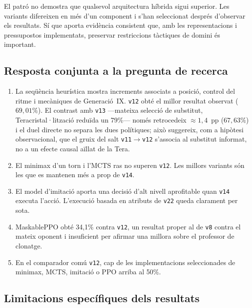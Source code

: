 El patró no demostra que qualsevol arquitectura híbrida sigui superior. Les variants difereixen en més d'un component i s'han seleccionat després d'observar els resultats. Sí que aporta evidència consistent que, amb les representacions i pressupostos implementats, preservar restriccions tàctiques de domini és important.

\subsection{Resposta conjunta a la pregunta de recerca}

\begin{enumerate}
    \item La seqüència heurística mostra increments associats a posició, control del ritme i mecàniques de Generació~IX. \texttt{v12} obté el millor resultat observat ($69{,}01\%$). El contrast amb \texttt{v13} ---mateixa selecció de substitut, Teracristal·lització reduïda un 79\%--- només retrocedeix $\approx 1{,}4$~pp ($67{,}63\%$) i el duel directe no separa les dues polítiques; això suggereix, com a hipòtesi observacional, que el gruix del salt \texttt{v11}$\to$\texttt{v12} s'associa al substitut informat, no a un efecte causal aïllat de la Tera.
    \item El minimax d'un torn i l'MCTS ras no superen \texttt{v12}. Les millors variants són les que es mantenen més a prop de \texttt{v14}.
    \item El model d'imitació aporta una decisió d'alt nivell aprofitable quan \texttt{v14} executa l'acció. L'execució basada en atributs de \texttt{v22} queda clarament per sota.
    \item MaskablePPO obté 34,1\% contra \texttt{v12}, un resultat proper al de \texttt{v8} contra el mateix oponent i insuficient per afirmar una millora sobre el professor de clonatge.
    \item En el comparador comú \texttt{v12}, cap de les implementacions seleccionades de minimax, MCTS, imitació o PPO arriba al 50\%.
\end{enumerate}

\subsection{Limitacions específiques dels resultats}

